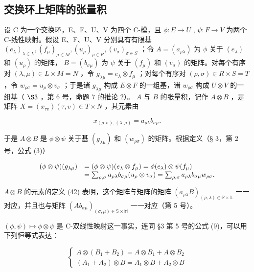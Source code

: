 \subsection{交换环上矩阵的张量积}

设 C 为一个交换环，E、F、U、V 为四个 C-模，且 \(\phi:E\to U\) , \(\psi:F\to V\) 为两个 C-线性映射。假设 E、F、U、V 分别具有有限基 \((e_{\lambda})_{\lambda \in L}, (f_{\mu})_{\mu \in M}, (u_{\rho})_{\rho \in R}, (v_{\sigma})_{\sigma \in S}\) ；令 \(A = (a_{\rho \lambda})\) 为 \(\phi\) 关于 \((e_{\lambda})\) 和 \((u_{\rho})\) 的矩阵， \(B = (b_{\sigma \mu})\) 为 \(\psi\) 关于 \((f_{\mu})\) 和 \((v_{\sigma})\) 的矩阵。对每个有序对 \((\lambda, \mu) \in L \times M = N\) ，令 \(g_{\lambda \mu} = e_{\lambda} \otimes f_{\mu}\) ；对每个有序对 \((\rho, \sigma) \in R \times S = T\) ，令 \(w_{\rho \sigma} = u_{\rho} \otimes v_{\sigma}\) ；于是诸 \(g_{\lambda \mu}\) 构成 \(E \otimes F\) 的一组基，诸 \(w_{\rho \sigma}\) 构成 \(U \otimes V\) 的一组基（ \(\S 3\) ，第 6 号，命题 7 的推论 2）。 \(A\) 与 \(B\) 的张量积，记作 \(A \otimes B\) ，是矩阵 \(X = (x_{\tau v})(\tau, v) \in T \times N\) ，其元素由

\[
x _ {(\rho , \sigma), (\lambda , \mu)} = a _ {\rho \lambda} b _ {\sigma \mu}.\tag{42}
\]

于是 \(A \otimes B\) 是 \(\phi \otimes \psi\) 关于基 \((g_{\lambda \mu})\) 和 \((w_{\rho \sigma})\) 的矩阵。根据定义（§ 3，第 2 号，公式 (3)）

\[
\begin{array}{r l} (\phi \otimes \psi) (g _ {\lambda \mu}) & = (\phi \otimes \psi) (e _ {\lambda} \otimes f _ {\mu}) = \phi (e _ {\lambda}) \otimes \psi (f _ {\mu}) \\ & = \sum_ {\rho , \sigma} a _ {\rho \lambda} b _ {\sigma \mu} (u _ {\rho} \otimes v _ {\sigma}) = \sum_ {\rho , \sigma} a _ {\rho \lambda} b _ {\sigma \mu} w _ {\rho \sigma}. \end{array}
\]

 \(A \otimes B\) 的元素的定义 (42) 表明，这个矩阵与矩阵的矩阵 \((a_{\rho \lambda}B)_{(\rho, \lambda) \in \mathbb{R} \times \mathbb{L}}\) 一一对应，并且也与矩阵 \((Ab_{\sigma \mu})_{(\sigma, \mu) \in \mathbb{S} \times \mathbb{M}}\) 一一对应（第 5 号）。

 \((\phi, \psi) \mapsto \phi \otimes \psi\) 是 C-双线性映射这一事实，连同 §3 第 5 号的公式 (9)，可以用下列恒等式表达：

\[
\left\{ \begin{array}{l} A \otimes (B _ {1} + B _ {2}) = A \otimes B _ {1} + A \otimes B _ {2} \\ (A _ {1} + A _ {2}) \otimes B = A _ {1} \otimes B + A _ {2} \otimes B \end{array} \right.\tag{43}
\]

